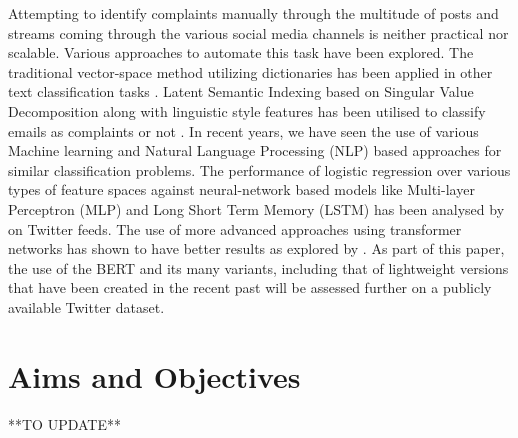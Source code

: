 Attempting to identify complaints manually through the multitude of posts and streams coming through the various social media channels is neither practical nor scalable. Various approaches to automate this task have been explored. The traditional vector-space method utilizing dictionaries has been applied in other text classification tasks \cite{liang_dictionary-based_2006}. Latent Semantic Indexing based on Singular Value Decomposition along with linguistic style features has been utilised to classify emails as complaints or not \cite{coussement_improving_2008}. In recent years, we have seen the use of various Machine learning and Natural Language Processing (NLP) based approaches for similar classification problems. The performance of logistic regression over various types of feature spaces against neural-network based models like Multi-layer Perceptron (MLP) and Long Short Term Memory (LSTM) has been analysed by \cite{preotiuc-pietro_automatically_2019} on Twitter feeds. The use of more advanced approaches using transformer networks has shown to have better results as explored by \cite{jin_complaint_2020}. As part of this paper, the use of the BERT and its many variants, including that of lightweight versions that have been created in the recent past will be assessed further on a publicly available Twitter dataset.

\section{Aims and Objectives}

**TO UPDATE**


